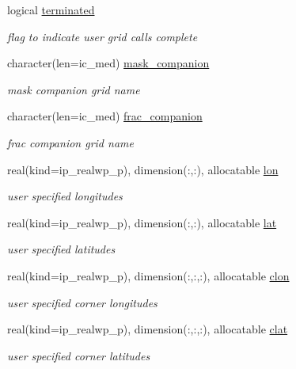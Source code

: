 \begin{DoxyCompactItemize}
logical \hyperlink{structmod__oasis__grid_1_1prism__grid__type_a2dcbbc51a20f881a1d06609688d72734}{terminated}
\begin{DoxyCompactList}\small\item\em flag to indicate user grid calls complete \end{DoxyCompactList}\item 
character(len=ic\+\_\+med) \hyperlink{structmod__oasis__grid_1_1prism__grid__type_a45c318b88ceaf6db5d5181c13e75abe0}{mask\+\_\+companion}
\begin{DoxyCompactList}\small\item\em mask companion grid name \end{DoxyCompactList}\item 
character(len=ic\+\_\+med) \hyperlink{structmod__oasis__grid_1_1prism__grid__type_a559e35e3bb8a820a101677c1da8f1934}{frac\+\_\+companion}
\begin{DoxyCompactList}\small\item\em frac companion grid name \end{DoxyCompactList}\item 
real(kind=ip\+\_\+realwp\+\_\+p), dimension(\+:,\+:), allocatable \hyperlink{structmod__oasis__grid_1_1prism__grid__type_a4f7fb8a71335506209709cfbe939ef7b}{lon}
\begin{DoxyCompactList}\small\item\em user specified longitudes \end{DoxyCompactList}\item 
real(kind=ip\+\_\+realwp\+\_\+p), dimension(\+:,\+:), allocatable \hyperlink{structmod__oasis__grid_1_1prism__grid__type_aa3a8ae208948be24ac3964c9d660afed}{lat}
\begin{DoxyCompactList}\small\item\em user specified latitudes \end{DoxyCompactList}\item 
real(kind=ip\+\_\+realwp\+\_\+p), dimension(\+:,\+:,\+:), allocatable \hyperlink{structmod__oasis__grid_1_1prism__grid__type_a7aac140b1875e0ecae3a816c0cd6d45e}{clon}
\begin{DoxyCompactList}\small\item\em user specified corner longitudes \end{DoxyCompactList}\item 
real(kind=ip\+\_\+realwp\+\_\+p), dimension(\+:,\+:,\+:), allocatable \hyperlink{structmod__oasis__grid_1_1prism__grid__type_a59d5122daaab45ad6578c7cc8f4fffc8}{clat}
\begin{DoxyCompactList}\small\item\em user specified corner latitudes \end{DoxyCompactList}\item 

\end{DoxyCompactItemize}
